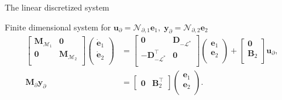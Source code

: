 \documentclass[aspectratio=169]{ISAE-Beamer}
\begin{document}
\begin{frame}{The linear discretized system}
\begin{exampleblock}{Finite dimensional system for $\bm{u}_\partial = \mathcal{N}_{\partial, 1} \displaystyle \bm{e}_1, \;  \bm{y}_\partial = \mathcal{N}_{\partial, 2} \displaystyle \bm{e}_2$}
	\begin{equation*}
	\begin{aligned}
	\begin{bmatrix}
	\mathbf{M}_{\mathcal{M}_1} & \mathbf{0} \\
	\mathbf{0} & \mathbf{M}_{\mathcal{M}_2} \\
	\end{bmatrix}
	\begin{pmatrix}
	\dot{\mathbf{e}}_{1} \\
	\dot{\mathbf{e}}_{2} \\
	\end{pmatrix}
	&= \begin{bmatrix}
	\mathbf{0} & \mathbf{D}_{-\mathcal{L}^*} \\
	- \mathbf{D}_{-\mathcal{L}^*}^\top & \mathbf{0} \\
	\end{bmatrix} 
	\begin{pmatrix}
	\mathbf{e}_{1} \\
	\mathbf{e}_{2} \\
	\end{pmatrix} + 
	\begin{bmatrix}
	\mathbf{0}\\
	\mathbf{B}_2\\
	\end{bmatrix}
	\mathbf{u}_\partial, \\
	\mathbf{M}_\partial {\mathbf{y}_\partial} &= 
	\begin{bmatrix}
	\mathbf{0} & \mathbf{B}_2^\top 
	\end{bmatrix}\begin{pmatrix}
	\mathbf{e}_{1} \\
	\mathbf{e}_{2} \\
	\end{pmatrix}.
	\end{aligned}
	\end{equation*}
\end{exampleblock}


\end{frame}
\end{document}
